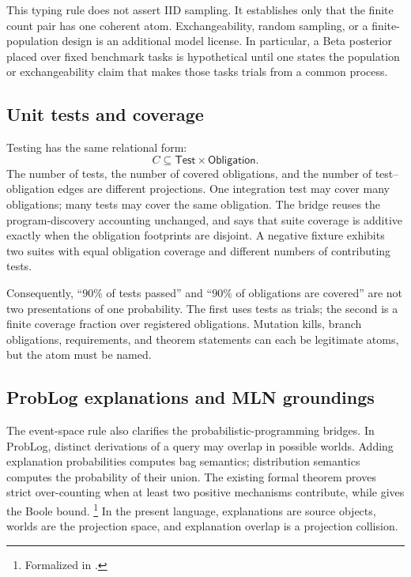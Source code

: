 \documentclass[11pt,openany]{report}
\begin{document}
This typing rule does not assert IID sampling.  It establishes only that the
finite count pair has one coherent atom.  Exchangeability, random sampling,
or a finite-population design is an additional model license.  In particular,
a Beta posterior placed over fixed benchmark tasks is hypothetical until one
states the population or exchangeability claim that makes those tasks trials
from a common process.

\subsection{Unit tests and coverage}

Testing has the same relational form:
\[
  C\subseteq \mathsf{Test}\times\mathsf{Obligation}.
\]
The number of tests, the number of covered obligations, and the number of
test--obligation edges are different projections.  One integration test may
cover many obligations; many tests may cover the same obligation.  The
 bridge reuses the program-discovery accounting
unchanged, and
 says that suite coverage is
additive exactly when the obligation footprints are disjoint.  A negative
fixture exhibits two suites with equal obligation coverage and different
numbers of contributing tests.

Consequently, ``$90\%$ of tests passed'' and ``$90\%$ of obligations are
covered'' are not two presentations of one probability.  The first uses tests
as trials; the second is a finite coverage fraction over registered
obligations.  Mutation kills, branch obligations, requirements, and theorem
statements can each be legitimate atoms, but the atom must be named.

\subsection{ProbLog explanations and MLN groundings}

The event-space rule also clarifies the probabilistic-programming bridges.
In ProbLog, distinct derivations of a query may overlap in possible worlds.
Adding explanation probabilities computes bag semantics; distribution
semantics computes the probability of their union.  The existing formal
theorem  proves strict over-counting when at least
two positive mechanisms contribute, while  gives the
Boole bound.%
\footnote{Formalized in
.}
In the present language, explanations are source objects, worlds are the
projection space, and explanation overlap is a projection collision.
\end{document}
